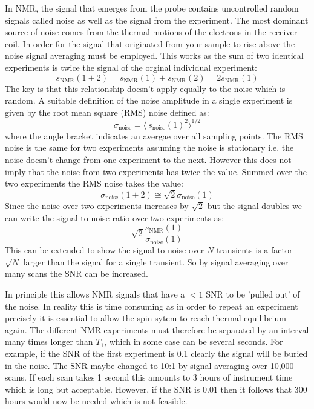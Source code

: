 In NMR, the signal that emerges from the probe contains uncontrolled random signals called noise as well
as the signal from the experiment. The most dominant source of noise comes from the thermal motions of the electrons
in the receiver coil. In order for the signal that originated from your sample to rise above the noise
signal averaging must be employed. This works as the sum of two identical experiments is twice the signal
of the orginal individual experiment:
\begin{equation}
  s_\text{NMR}(1+2) = s_\text{NMR}(1) + s_\text{NMR}(2) = 2s_\text{NMR}(1)
\end{equation}
The key is that this relationship doesn't apply equally to the noise which is random. A suitable
definition of the noise amplitude in a single experiment is given by the root mean square (RMS) noise defined
as:
\begin{equation}
  \sigma_\text{{noise}} = \langle~s_{\text{noise}}(1)^2\rangle^{1/2}
\end{equation}
where the angle bracket indicates an avergae over all sampling points. The RMS noise is the same for two
experiments assuming the noise is stationary i.e. the noise doesn't change from one experiment to the next.
However this does not imply that the noise from two experiments has twice the value. Summed over the two experiments
the RMS noise takes the value:
\begin{equation}
  \sigma_\text{{noise}}(1+2) \cong \sqrt{2}\sigma_{\text{noise}}(1)
\end{equation}
Since the noise over two experiments increases by $\sqrt{2}$ but the signal doubles we can write the signal to noise
ratio over two experiments as:
\begin{equation}
  \sqrt{2}\frac{s_{\text{NMR}}(1)}{\sigma_{\text{noise}}(1)}
\end{equation}
This can be extended to show the signal-to-noise over $N$ transients is a factor $\sqrt{N}$ larger than the
signal for a single transient. So by signal averaging over many scans the SNR can be increased.

 In principle this allows NMR signals that have a $<1$ SNR to be 'pulled out' of the noise. In reality this is
 time consuming as in order to repeat an experiment precisely it is essential to allow the spin sytem to
 reach thermal equilibrium again. The different NMR experiments must therefore be separated by an interval
 many times longer than $T_1$, which in some case can be several seconds. For example, if the SNR of the first
 experiment is 0.1 clearly the signal will be buried in the noise. The SNR maybe changed to 10:1 by signal averaging
 over 10,000 scans. If each scan takes 1 second this amounts to 3 hours of instrument time which is long but
 acceptable. However, if the SNR is 0.01 then it follows that 300 hours would now be needed which is not feasible.

